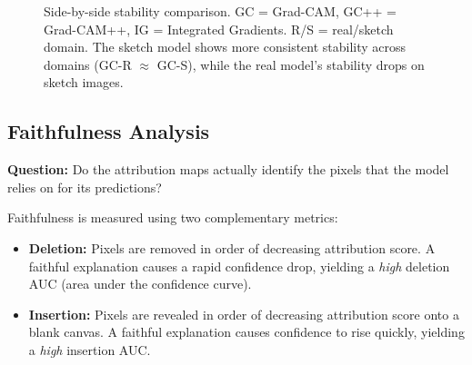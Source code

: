 \documentclass[12pt, a4paper]{article}
\begin{document}
\begin{figure}[H]
\centering
{}
\caption{Side-by-side stability comparison.  GC = Grad-CAM,
GC++ = Grad-CAM++, IG = Integrated Gradients.  R/S = real/sketch domain.
The sketch model shows more consistent stability across domains (GC-R
$\approx$ GC-S), while the real model's stability drops on sketch images.}
\label{fig:stability_comparison}
\end{figure}


\subsection{Faithfulness Analysis}
\label{sec:faithfulness}

\textbf{Question:} Do the attribution maps actually identify the pixels that
the model relies on for its predictions?

Faithfulness is measured using two complementary metrics:
\begin{itemize}[leftmargin=*]
    \item \textbf{Deletion:} Pixels are removed in order of decreasing
          attribution score.  A faithful explanation causes a rapid confidence
          drop, yielding a \emph{high} deletion AUC (area under the confidence
          curve).
    \item \textbf{Insertion:} Pixels are revealed in order of decreasing
          attribution score onto a blank canvas.  A faithful explanation causes
          confidence to rise quickly, yielding a \emph{high} insertion AUC.
\end{itemize}
\end{document}
